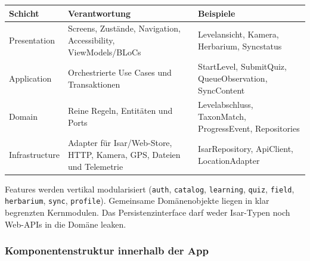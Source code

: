 \documentclass[10pt,a4paper,oneside]{article}
\newcommand{\Code}[1]{\texttt{\small #1}}
\begin{document}
\begin{tabularx}{\textwidth}{@{}p{34mm}X X@{}}
\toprule
\textbf{Schicht} & \textbf{Verantwortung} & \textbf{Beispiele} \\
\midrule
Presentation & Screens, Zustände, Navigation, Accessibility, ViewModels/BLoCs & Levelansicht, Kamera, Herbarium, Syncstatus \\
Application & Orchestrierte Use Cases und Transaktionen & StartLevel, SubmitQuiz, QueueObservation, SyncContent \\
Domain & Reine Regeln, Entitäten und Ports & Levelabschluss, TaxonMatch, ProgressEvent, Repositories \\
Infrastructure & Adapter für Isar/Web-Store, HTTP, Kamera, GPS, Dateien und Telemetrie & IsarRepository, ApiClient, LocationAdapter \\
\bottomrule
\end{tabularx}

Features werden vertikal modularisiert (\Code{auth}, \Code{catalog}, \Code{learning}, \Code{quiz}, \Code{field}, \Code{herbarium}, \Code{sync}, \Code{profile}). Gemeinsame Domänenobjekte liegen in klar begrenzten Kernmodulen. Das Persistenzinterface darf weder Isar-Typen noch Web-APIs in die Domäne leaken.

\subsubsection{Komponentenstruktur innerhalb der App}\label{sec:app-components}
\end{document}
